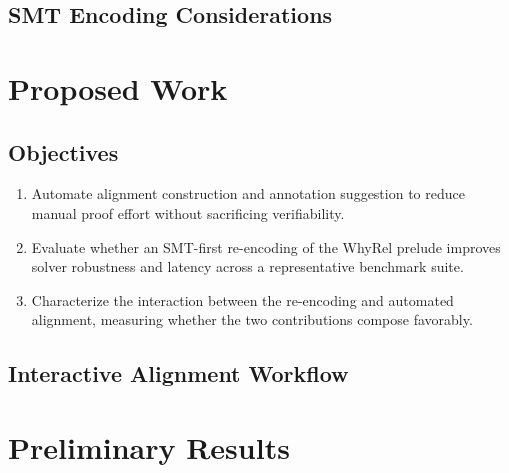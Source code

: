 \documentclass[12pt,letterpaper]{article}
\begin{document}
\subsection{SMT Encoding Considerations}
\label{sec:encoding}


\section{Proposed Work}
\label{sec:proposed}

\subsection{Objectives}

\begin{enumerate}
  \item Automate alignment construction and annotation suggestion to reduce
        manual proof effort without sacrificing verifiability.
  \item Evaluate whether an SMT-first re-encoding of the WhyRel prelude
        improves solver robustness and latency across a representative
        benchmark suite.
  \item Characterize the interaction between the re-encoding and automated
        alignment, measuring whether the two contributions compose favorably.
\end{enumerate}

\subsection{Interactive Alignment Workflow}
\label{sec:align}




\section{Preliminary Results}
\label{sec:prelim}

\end{document}

